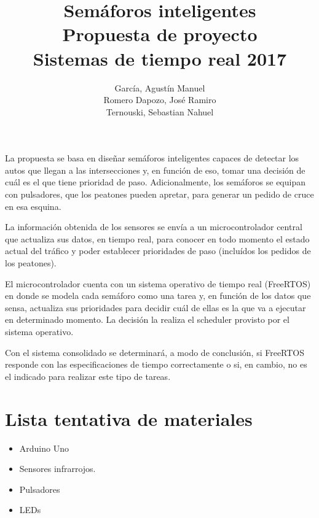 \documentclass[a4paper,11pt]{article}
\title{Semáforos inteligentes
		\\{\large Propuesta de proyecto\\ Sistemas de tiempo real 2017}}
\author{García, Agustín Manuel
\\Romero Dapozo, José Ramiro
\\Ternouski, Sebastian Nahuel}
\date{}
\begin{document}
\maketitle

La propuesta se basa en diseñar semáforos inteligentes capaces de detectar los autos que llegan a las intersecciones y, en función de eso, tomar una decisión de cuál es el que tiene prioridad de paso. Adicionalmente, los semáforos se equipan con pulsadores, que los peatones pueden apretar, para generar un pedido de cruce en esa esquina.

La información obtenida de los sensores se envía a un microcontrolador central que actualiza sus datos, en tiempo real, para conocer en todo momento el estado actual del tráfico y poder establecer prioridades de paso (incluídos los pedidos de los peatones).

El microcontrolador cuenta con un sistema operativo de tiempo real (FreeRTOS) en donde se modela cada semáforo como una tarea y, en función de los datos que sensa, actualiza sus prioridades para decidir cuál de ellas es la que va a ejecutar en determinado momento. La decisión la realiza el scheduler provisto por el sistema operativo.

Con el sistema consolidado se determinará, a modo de conclusión, si FreeRTOS responde con las especificaciones de tiempo correctamente o si, en cambio, no es el indicado para realizar este tipo de tareas.

\section*{Lista tentativa de materiales}
\begin{itemize}
	\item Arduino Uno
	\item Sensores infrarrojos.
	\item Pulsadores
	\item LEDs
\end{itemize}
\end{document}
